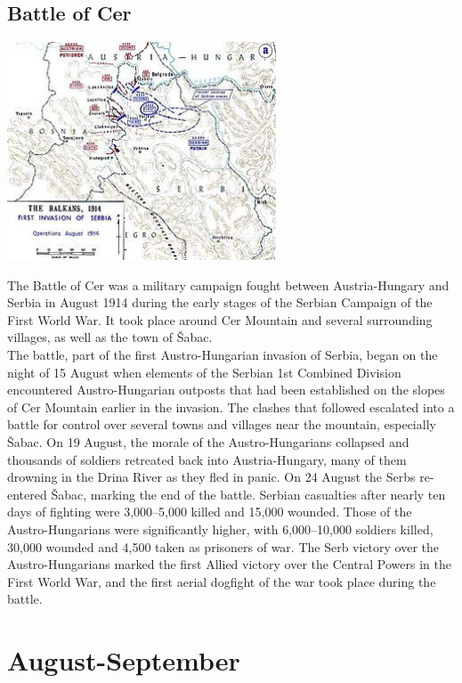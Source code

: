 \documentclass[11pt]{report}
\begin{document}
\subsection{Battle of Cer}
\vspace{2mm}\begin{center}\includegraphics[width=8cm]{./img/battleOfCer.jpg}\end{center}
The Battle of Cer was a military campaign fought between Austria-Hungary and Serbia in August 1914 during the early stages of the Serbian Campaign of the First World War. It took place around Cer Mountain and several surrounding villages, as well as the town of Šabac.\\
The battle, part of the first Austro-Hungarian invasion of Serbia, began on the night of 15 August when elements of the Serbian 1st Combined Division encountered Austro-Hungarian outposts that had been established on the slopes of Cer Mountain earlier in the invasion. The clashes that followed escalated into a battle for control over several towns and villages near the mountain, especially Šabac. On 19 August, the morale of the Austro-Hungarians collapsed and thousands of soldiers retreated back into Austria-Hungary, many of them drowning in the Drina River as they fled in panic. On 24 August the Serbs re-entered Šabac, marking the end of the battle. Serbian casualties after nearly ten days of fighting were 3,000–5,000 killed and 15,000 wounded. Those of the Austro-Hungarians were significantly higher, with 6,000–10,000 soldiers killed, 30,000 wounded and 4,500 taken as prisoners of war. The Serb victory over the Austro-Hungarians marked the first Allied victory over the Central Powers in the First World War, and the first aerial dogfight of the war took place during the battle.
\section{August-September}
\end{document}
